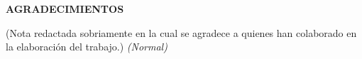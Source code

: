 \begin{center}
    \textbf{AGRADECIMIENTOS}
\end{center}
\vspace{1cm}
(Nota redactada sobriamente en la cual se agradece a quienes han colaborado en la elaboración del trabajo.) \textit{(Normal)}

\newpage